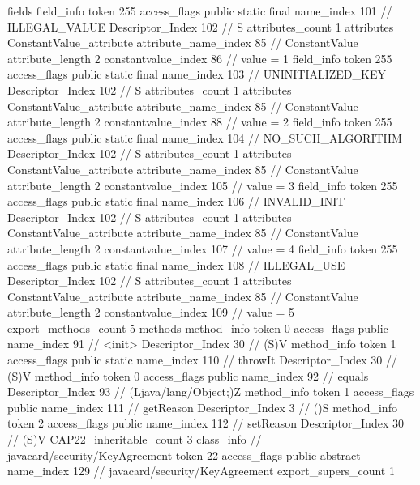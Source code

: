 {{{			fields {
			field_info {
				token	255
				access_flags	public static final
				name_index	101		// ILLEGAL_VALUE
				Descriptor_Index	102		// S
				attributes_count	1
				attributes {
				ConstantValue_attribute {
					attribute_name_index	85		// ConstantValue
					attribute_length	2
					constantvalue_index	86		// value = 1
				}
				}
			}
			field_info {
				token	255
				access_flags	public static final
				name_index	103		// UNINITIALIZED_KEY
				Descriptor_Index	102		// S
				attributes_count	1
				attributes {
				ConstantValue_attribute {
					attribute_name_index	85		// ConstantValue
					attribute_length	2
					constantvalue_index	88		// value = 2
				}
				}
			}
			field_info {
				token	255
				access_flags	public static final
				name_index	104		// NO_SUCH_ALGORITHM
				Descriptor_Index	102		// S
				attributes_count	1
				attributes {
				ConstantValue_attribute {
					attribute_name_index	85		// ConstantValue
					attribute_length	2
					constantvalue_index	105		// value = 3
				}
				}
			}
			field_info {
				token	255
				access_flags	public static final
				name_index	106		// INVALID_INIT
				Descriptor_Index	102		// S
				attributes_count	1
				attributes {
				ConstantValue_attribute {
					attribute_name_index	85		// ConstantValue
					attribute_length	2
					constantvalue_index	107		// value = 4
				}
				}
			}
			field_info {
				token	255
				access_flags	public static final
				name_index	108		// ILLEGAL_USE
				Descriptor_Index	102		// S
				attributes_count	1
				attributes {
				ConstantValue_attribute {
					attribute_name_index	85		// ConstantValue
					attribute_length	2
					constantvalue_index	109		// value = 5
				}
				}
			}
			}
			export_methods_count	5
			methods {
				method_info {
					token	0
					access_flags	public
					name_index	91		// <init>
					Descriptor_Index	30		// (S)V
				}
				method_info {
					token	1
					access_flags	public static
					name_index	110		// throwIt
					Descriptor_Index	30		// (S)V
				}
				method_info {
					token	0
					access_flags	public
					name_index	92		// equals
					Descriptor_Index	93		// (Ljava/lang/Object;)Z
				}
				method_info {
					token	1
					access_flags	public
					name_index	111		// getReason
					Descriptor_Index	3		// ()S
				}
				method_info {
					token	2
					access_flags	public
					name_index	112		// setReason
					Descriptor_Index	30		// (S)V
				}
			}
			CAP22_inheritable_count	3
		}
		class_info {		// javacard/security/KeyAgreement
			token	22
			access_flags	public abstract
			name_index	129		// javacard/security/KeyAgreement
			export_supers_count	1
}}}
